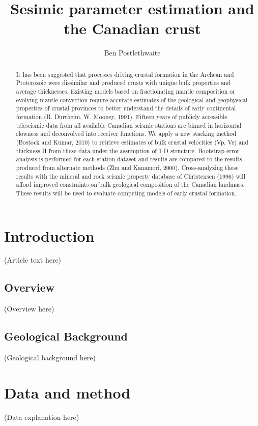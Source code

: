 \documentclass[draft]{article}
\title{Sesimic parameter estimation and the Canadian crust}
\author{Ben Postlethwaite}
\begin{document}
\begin{abstract}
It has been suggested that processes driving crustal formation in the Archean and Proterozoic were dissimilar and produced crusts with unique bulk properties and average thicknesses. Existing models based on fractionating mantle composition or evolving mantle convection require accurate estimates of the geological and geophysical properties of crustal provinces to better understand the details of early continental formation (R. Durrheim, W. Mooney, 1991). Fifteen years of publicly accessible teleseismic data from all available Canadian seismic stations are binned in horizontal slowness and deconvolved into receiver functions. We apply a new stacking method (Bostock and Kumar, 2010) to retrieve estimates of bulk crustal velocities (Vp, Vs) and thickness H from these data under the assumption of 1-D structure. Bootstrap error analysis is performed for each station dataset and results are compared to the results produced from alternate methods (Zhu and Kanamori, 2000). Cross-analyzing these results with the mineral and rock seismic property database of Christensen (1996) will afford improved constraints on bulk geological composition of the Canadian landmass. These results will be used to evaluate competing models of early crustal formation.
\end{abstract}


\section{Introduction}
(Article text here)
\subsection{Overview}
(Overview here)
\subsection{Geological Background}
(Geological background here)

\section{Data and method}
(Data explanation here)
\end{document}
